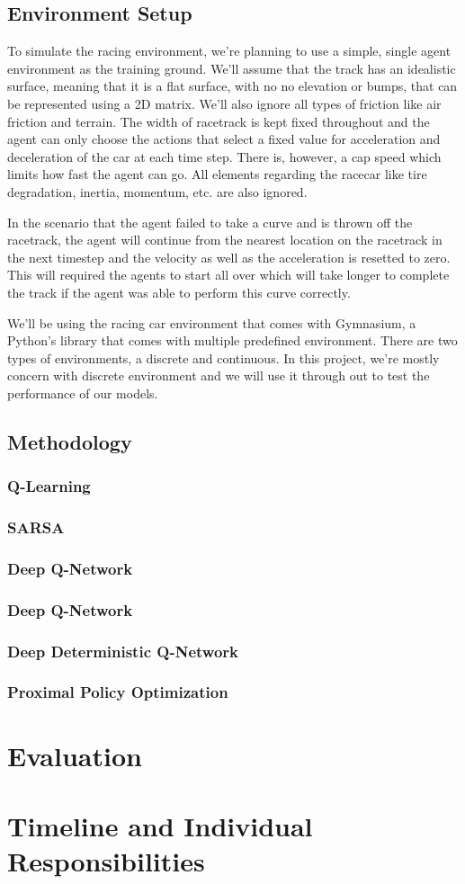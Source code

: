 \documentclass{article}
\begin{document}
\subsection{Environment Setup}
To simulate the racing environment, we're planning to use a simple, single agent
environment as the training ground. We'll assume that the track has an
idealistic surface, meaning that it is a flat surface, with no no elevation or
bumps, that can be represented
using a 2D matrix. We'll also ignore all types of friction like air friction and terrain. 
The width of racetrack is kept fixed throughout and the agent can only choose
the actions that select a fixed value for acceleration and deceleration of the
car at each time step. There is, however, a cap speed which limits how fast the
agent can go. All elements regarding the racecar like tire degradation, inertia, momentum,
etc. are also ignored. 

In the scenario that the agent failed to take a curve and is thrown off the
racetrack, the agent will continue from the nearest location on the racetrack in
the next timestep and the velocity as well as the acceleration is resetted to
zero. This will required the agents to start all over which will take longer to
complete the track if the agent was able to perform this curve correctly.

We'll be using the racing car environment that comes with Gymnasium, a
Python's library that comes with multiple predefined environment. There are two types of environments, a
discrete and continuous. In this project, we're mostly concern with discrete
environment and we will use it through out to test the performance of our models.
\subsection{Methodology}
\subsubsection{Q-Learning}

\subsubsection{SARSA}
\subsubsection{Deep Q-Network}
\subsubsection{Deep Q-Network}
\subsubsection{Deep Deterministic Q-Network}
\subsubsection{Proximal Policy Optimization}
\section{Evaluation}
\section{Timeline and Individual Responsibilities}



\end{document}

